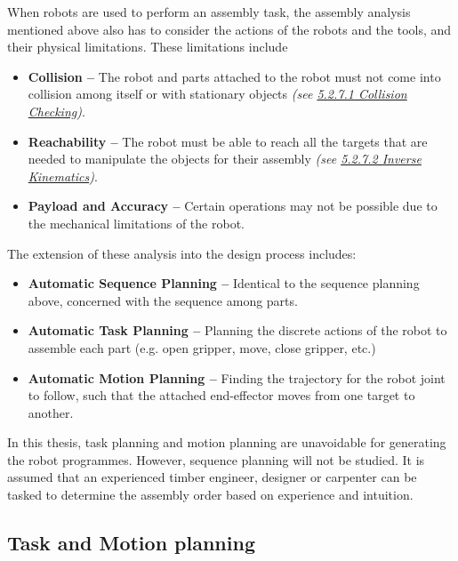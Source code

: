 When robots are used to perform an assembly task, the assembly analysis mentioned above also has to consider the actions of the robots and the tools, and their physical limitations. These limitations include

\begin{itemize}
    \item \textbf{Collision --} The robot and parts attached to the robot must not come into collision among itself or with stationary objects \textit{(see \ul{5.2.7.1 Collision Checking})}.

	\item \textbf{Reachability --} The robot must be able to reach all the targets that are needed to manipulate the objects for their assembly \textit{(see \ul{5.2.7.2 Inverse Kinematics})}.

	\item \textbf{Payload and Accuracy --} Certain operations may not be possible due to the mechanical limitations of the robot.
\end{itemize}

The extension of these analysis into the design process includes:

\begin{itemize}
	\item \textbf{Automatic Sequence Planning --} Identical to the sequence planning above, concerned with the sequence among parts.

	\item \textbf{Automatic Task Planning --} Planning the discrete actions of the robot to assemble each part (e.g. open gripper, move, close gripper, etc.) \parencite{homemdemelloTaskSequencePlanning1989}

	\item \textbf{Automatic Motion Planning --} Finding the trajectory for the robot joint to follow, such that the attached end-effector moves from one target to another. \parencite{lavallePlanningAlgorithms2006}
\end{itemize}

In this thesis, task planning and motion planning are unavoidable for generating the robot programmes. However, sequence planning will not be studied. It is assumed that an experienced timber engineer, designer or carpenter can be tasked to determine the assembly order based on experience and intuition.

\subsection{Task and Motion planning}

